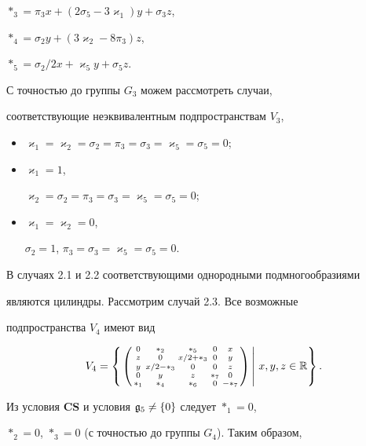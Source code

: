 $*_3=\pi_3 x+(2\sigma_5-3\varkappa_1)y+\sigma_3 z$, 


$*_4=\sigma_2y+(3\varkappa_2-8\pi_3)z$,


$*_5=\sigma_2/2 x+\varkappa_5y+\sigma_5 z$. 


С точностью до группы $G_3$ можем рассмотреть случаи,


соответствующие неэквивалентным подпространствам $V_3$,


\begin{itemize}


\item[2.1] $\varkappa_1=\varkappa_2=\sigma_2=\pi_3=


\sigma_3=\varkappa_5=\sigma_5=0$;


\item[2.2] $\varkappa_1=1$,


$\varkappa_2=\sigma_2=\pi_3=\sigma_3=\varkappa_5=\sigma_5=0$;


\item[2.3] $\varkappa_1=\varkappa_2=0$,


$\sigma_2=1$, $\pi_3=\sigma_3=\varkappa_5=\sigma_5=0$.


\end{itemize}





В случаях 2.1 и 2.2 соответствующими однородными подмногообразиями


являются цилиндры. Рассмотрим случай 2.3. Все возможные


подпространства $V_4$ имеют вид


$$


V_4=\left\{\left.


\left(\begin{smallmatrix}


0&{}*_2&{}*_5&0&x \\ z&0&x/2+{}*_3&0&y\\ y &x/2-{}*_3&0&0&z \\


0&y&z&{}*_7&0\\ {}*_1&{}*_4&{}*_6&0&-{}*_7


\end{smallmatrix}\right)\,\right|\,x,y,z\in\Bbb R\right\}.


$$





Из условия {\bf CS} и условия $\frak g_5\ne\{0\}$ следует $*_1=0$,


$*_2=0$, $*_3=0$ (с точностью до группы $G_4$). Таким образом,


